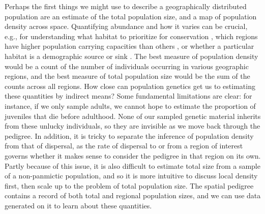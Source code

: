 \documentclass{ar-1col}
\begin{document}
Perhaps the first things we might use
to describe a geographically distributed population
are an estimate of the total population size,
and a map of population density across space.
Quantifying abundance and how it varies
can be crucial, e.g., for understanding
what habitat to prioritize for conservation \citep{zipkin2018synthesizing}, 
which regions have higher population carrying capacities than others \citep{roughgarden1974}, 
or whether a particular habitat is a demographic source or sink 
\citep{pulliam1988sources}.
The best measure of population density
would be a count of the number of individuals occurring in various geographic regions, 
and the best measure of total population size would be the sum of the counts across all regions.
How close can population genetics get us to estimating these quantities by indirect means?
Some fundamental limitations are clear:
for instance, if we only sample adults,
we cannot hope to estimate the proportion of juveniles that die before adulthood.
None of our sampled genetic material inherits from these unlucky individuals,
so they are invisible as we move back through the pedigree.
In addition, it is tricky to separate the inference of population density 
from that of dispersal, 
as the rate of dispersal to or from a region of interest 
governs whether it makes sense to consider the pedigree in that region on its own.
Partly because of this issue, 
it is also difficult to estimate total size from a sample of a 
non-panmictic population, 
and so it is more intuitive to discuss local density first, 
then scale up to the problem of total population size.
The spatial pedigree contains a record of both total and regional population sizes, 
and we can use data generated on it to learn about these quantities.
\end{document}
